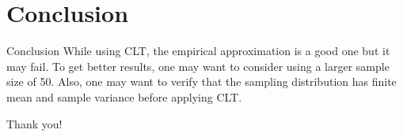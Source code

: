 \documentclass[10pt]{beamer}
\begin{document}
\section{Conclusion}
\begin{frame}{Conclusion}
    While using CLT, the empirical approximation is a good one but it may fail. To get better results, one may want to consider using a larger sample size of 50. Also, one may want to verify that the sampling distribution has finite mean and sample variance before applying CLT.
\end{frame}
\begin{frame}
\textcolor{myNewColorA}{\Huge{\centerline{Thank you!}}}
\end{frame}
\end{document}
